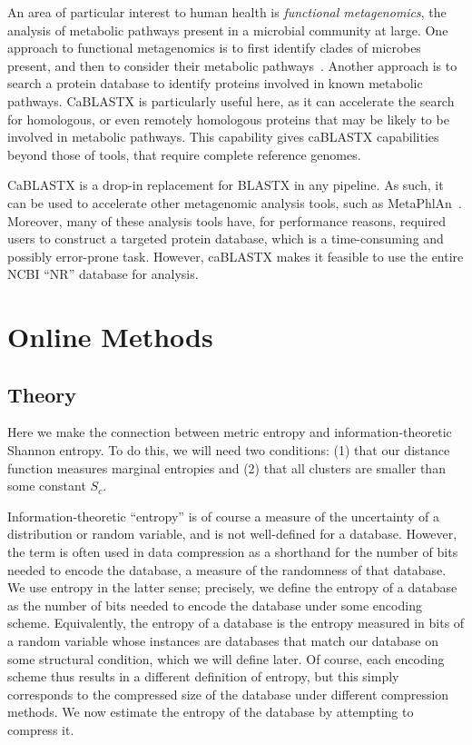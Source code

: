 \documentclass{amsbook}
\theoremstyle{definition}
\theoremstyle{remark}
\numberwithin{equation}{section}
\begin{document}
An area of particular interest to human health is \emph{functional 
metagenomics}, the analysis of metabolic pathways present in a microbial
community at large.
One approach to functional metagenomics is to first identify clades of
microbes present, and then to consider their metabolic pathways~\cite{blah}.
Another approach is to search a protein database to identify proteins involved
in known metabolic pathways.
CaBLASTX is particularly useful here, as it can accelerate the search for
homologous, or even remotely homologous proteins that may be likely to be
involved in metabolic pathways.
This capability gives caBLASTX capabilities beyond those of tools, that require
complete reference genomes.

CaBLASTX is a drop-in replacement for BLASTX in any pipeline.
As such, it can be used to accelerate other metagenomic analysis tools, such
as MetaPhlAn~\cite{blah}.
Moreover, many of these analysis tools have, for performance reasons, required
users to construct a targeted protein database, which is a time-consuming and
possibly error-prone task.
However, caBLASTX makes it feasible to use the entire NCBI ``NR'' database for
analysis.

\chapter{Online Methods}

\section{Theory}
Here we make the connection between metric entropy and information-theoretic Shannon entropy.
To do this, we will need two conditions: (1) that our distance function measures marginal entropies and (2) that all clusters are smaller than some constant $S_c$.

Information-theoretic ``entropy'' is of course a measure of the uncertainty of a distribution or random variable, and is not well-defined for a database.
However, the term is often used in data compression as a shorthand for the number of bits needed to encode the database, a measure of the randomness of that database.
We use entropy in the latter sense; precisely, we define the entropy of a database as the number of bits needed to encode the database under some encoding scheme.
Equivalently, the entropy of a database is the entropy measured in bits of a random variable whose instances are databases that match our database on some structural condition, which we will define later.
Of course, each encoding scheme thus results in a different definition of entropy, but this simply corresponds to the compressed size of the database under different compression methods.
We now estimate the entropy of the database by attempting to compress it.
\end{document}
